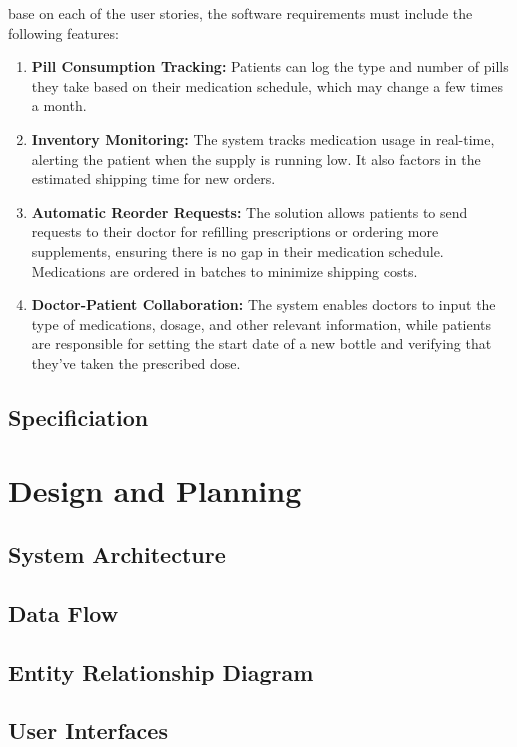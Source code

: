 \documentclass{article}
\begin{document}
base on each of the user stories, the software requirements must include the following features: 
\begin{enumerate}
    \item \textbf{Pill Consumption Tracking:} Patients can log the type and number of pills they take based on their medication schedule, which may change a few times a month.
    \item \textbf{Inventory Monitoring:} The system tracks medication usage in real-time, alerting the patient when the supply is running low. It also factors in the estimated shipping time for new orders.
    \item \textbf{Automatic Reorder Requests:} The solution allows patients to send requests to their doctor for refilling prescriptions or ordering more supplements, ensuring there is no gap in their medication schedule. Medications are ordered in batches to minimize shipping costs.
    \item \textbf{Doctor-Patient Collaboration:} The system enables doctors to input the type of medications, dosage, and other relevant information, while patients are responsible for setting the start date of a new bottle and verifying that they’ve taken the prescribed dose.
\end{enumerate}
\subsection{Specificiation}
\section{Design and Planning}
\subsection{System Architecture}
\subsection{Data Flow }
\subsection{Entity Relationship Diagram}
\subsection{User Interfaces}
\end{document}
